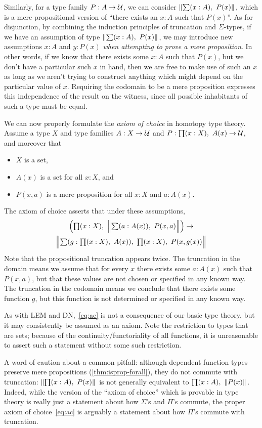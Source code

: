 Similarly, for a type family $P:A\to\mathcal{U}$, we can consider $\brck{\sm{x:A} P(x)}$, which is a mere propositional version of ``there exists an $x:A$ such that $P(x)$''.
As for disjunction, by combining the induction principles of truncation and $\Sigma$-types, if we have an assumption of type $\brck{\sm{x:A} P(x)}$, we may introduce new assumptions $x:A$ and $y:P(x)$ \emph{when attempting to prove a mere proposition}.
In other words, if we know that there exists some $x:A$ such that $P(x)$, but we don't have a particular such $x$ in hand, then we are free to make use of such an $x$ as long as we aren't trying to construct anything which might depend on the particular value of $x$.
Requiring the codomain to be a mere proposition expresses this independence of the result on the witness, since all possible inhabitants of such a type must be equal.

We can now properly formulate the \emph{axiom of choice} in homotopy type theory.
Assume a type $X$ and type families $A:X\to\mathcal{U}$ and $P:\prd{x:X} A(x)\to\type$, and moreover that
\begin{itemize}
\item $X$ is a set,
\item $A(x)$ is a set for all $x:X$, and
\item $P(x,a)$ is a mere proposition for all $x:X$ and $a:A(x)$.
\end{itemize}
The axiom of choice asserts that under these assumptions,
\begin{multline}\label{eq:ac}
  \left(\prd{x:X} \Brck{\sm{a:A(x)} P(x,a)}\right)
  \to\\
  \Brck{\sm{g:\prd{x:X} A(x)} \prd{x:X} P(x,g(x))}
\end{multline}
Note that the propositional truncation appears twice.
The truncation in the domain means we assume that for every $x$ there exists some $a:A(x)$ such that $P(x,a)$, but that these values are not chosen or specified in any known way.
The truncation in the codomain means we conclude that there exists some function $g$, but this function is not determined or specified in any known way.

As with LEM and DN,~\eqref{eq:ac} is not a consequence of our basic type theory, but it may consistently be assumed as an axiom.
Note the restriction to types that are sets; because of the continuity/functoriality of all functions, it is unreasonable to assert such a statement without some such restriction.

\begin{rmk}
  A word of caution about a common pitfall: although dependent function types preserve mere propositions (\autoref{thm:isprop-forall}), they do not commute with truncation: $\brck{\prd{x:A} P(x)}$ is not generally equivalent to $\prd{x:A} \brck{P(x)}$.
  Indeed, while the version of the ``axiom of choice'' which is provable in type theory is really just a statement about how $\Sigma$'s and $\Pi$'s commute, the proper axiom of choice~\eqref{eq:ac} is arguably a statement about how $\Pi$'s commute with truncation.
\end{rmk}



